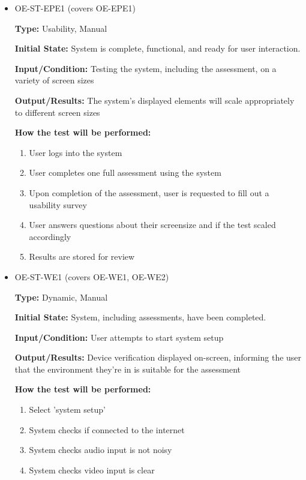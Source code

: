 \documentclass[12pt, titlepage]{article}
\begin{document}
\begin{itemize}
  \item OE-ST-EPE1 (covers OE-EPE1)
  \begin{mdframed}[linewidth=0.5mm]
      \textbf{Type:} Usability, Manual\par
      \textbf{Initial State:} System is complete, functional, and ready for user interaction. \par
      \textbf{Input/Condition:} Testing the system, including the assessment, on a variety of screen sizes \par
      \textbf{Output/Results:} The system's displayed elements will scale appropriately to different screen sizes \par
      \textbf{How the test will be performed:}
      \begin{enumerate}[noitemsep]
        \item User logs into the system
        \item User completes one full assessment using the system
        \item Upon completion of the assessment, user is requested to fill out a usability survey
        \item User answers questions about their screensize and if the test scaled accordingly
        \item Results are stored for review
      \end{enumerate}
  \end{mdframed}
  \item OE-ST-WE1 (covers OE-WE1, OE-WE2)
  \begin{mdframed}[linewidth=0.5mm]
      \textbf{Type:} Dynamic, Manual \par
      \textbf{Initial State:} System, including assessments, have been completed. \par
      \textbf{Input/Condition:} User attempts to start system setup\par
      \textbf{Output/Results:} Device verification displayed on-screen, informing the user that the environment they're in is suitable for the assessment \par
      \textbf{How the test will be performed:}
      \begin{enumerate}[noitemsep]
        \item Select 'system setup'
        \item System checks if connected to the internet
        \item System checks audio input is not noisy
        \item System checks video input is clear

\end{enumerate}
\end{mdframed}
\end{itemize}
\end{document}
